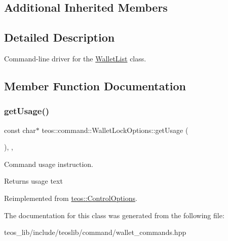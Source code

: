 \subsection*{Additional Inherited Members}


\subsection{Detailed Description}
Command-\/line driver for the \mbox{\hyperlink{classteos_1_1command_1_1_wallet_list}{Wallet\+List}} class. 

\subsection{Member Function Documentation}
\mbox{\label{classteos_1_1command_1_1_wallet_lock_options_aa0b3fd6dc244e1f32955c7a134b4fd85}} 
\subsubsection{\texorpdfstring{get\+Usage()}{getUsage()}}
{\footnotesize\ttfamily const char$\ast$ teos\+::command\+::\+Wallet\+Lock\+Options\+::get\+Usage (\begin{DoxyParamCaption}{ }\end{DoxyParamCaption})\hspace{0.3cm}{\ttfamily [inline]}, {\ttfamily [protected]}, {\ttfamily [virtual]}}



Command \textquotesingle{}usage\textquotesingle{} instruction. 

\begin{DoxyReturn}{Returns}
usage text 
\end{DoxyReturn}


Reimplemented from \mbox{\hyperlink{classteos_1_1_control_options_a0aa5671f9bc750ed5280c26c543874f3}{teos\+::\+Control\+Options}}.



The documentation for this class was generated from the following file\+:\begin{DoxyCompactItemize}
\item 
teos\+\_\+lib/include/teoslib/command/wallet\+\_\+commands.\+hpp\end{DoxyCompactItemize}

